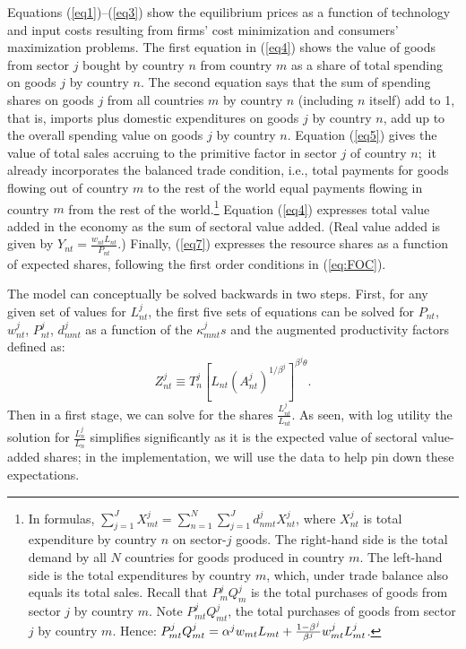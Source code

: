 \documentclass{article}
\begin{document}
Equations (\ref{eq1})--(\ref{eq3}) show the equilibrium prices as a function
of technology and input costs resulting from firms' cost minimization and
consumers' maximization problems. The first equation in (\ref{eq4}) shows
the value of goods from sector $j$ bought by country $n$ from country $m$ as
a share of total spending on goods $j$ by country $n.$ The second equation
says that the sum of spending shares on goods $j$ from all countries $m$ by
country $n$ (including $n$ itself) add to 1, that is, imports plus domestic
expenditures on goods $j$ by country $n$, add up to the overall spending
value on goods $j$ by country $n.$ Equation (\ref{eq5}) gives the value of
total sales accruing to the primitive factor in sector $j$ of country $n;$
it already incorporates the balanced trade condition, i.e., total payments
for goods flowing out of country $m$ to the rest of the world equal payments
flowing in country $m$ from the rest of the world.\footnote{%
In formulas, $\sum\nolimits_{j=1}^{J}X_{mt}^{j}=\sum\nolimits_{n=1}^{N}\sum%
\nolimits_{j=1}^{J}d_{nmt}^{j}X_{nt}^{j}$, where $X_{nt}^{j}$ is total
expenditure by country $n$ on sector-$j$ goods. The right-hand side is the
total demand by all $N$ countries for goods produced in country $m$. The
left-hand side is the total expenditures by country $m$, which, under trade
balance also equals its total sales. Recall that $P_{m}^{j}Q_{m}^{j}$ is the
total purchases of goods from sector $j$ by country $m.$ Note $%
P_{mt}^{j}Q_{mt}^{j}$, the total purchases of goods from sector $j$ by
country $m.$ Hence: $P_{mt}^{j}Q_{mt}^{j}=\alpha ^{j}w_{mt}L_{mt}+\frac{%
1-\beta ^{j}}{\beta ^{j}}w_{mt}^{j}L_{mt}^{j}$.} Equation (\ref{eq4})
expresses total value added in the economy as the sum of sectoral value
added. (Real value added is given by $Y_{nt}=\frac{w_{nt}L_{nt}}{P_{nt}}$.)
Finally, (\ref{eq7}) expresses the resource shares as a function of expected
shares, following the first order conditions in (\ref{eq:FOC}).

The model can conceptually be solved backwards in two steps. First, for any
given set of values for $L_{nt}^{j}$, the first five sets of equations can
be solved for $P_{nt}$, $w_{nt}^{j}$, $P_{nt}^{j}$, $d_{nmt}^{j}$ as a
function of the $\kappa _{mnt}^{j}s$ and the augmented productivity factors
defined as: 
\begin{equation}
Z_{nt}^{j}\equiv T_{n}^{j}\left[ L_{nt}\left( A_{nt}^{j}\right) ^{1/\beta
^{j}}\right] ^{\beta ^{j}\theta }.  \label{productivityfactor}
\end{equation}%
Then in a first stage, we can solve for the shares $\frac{L_{nt}^{j}}{L_{nt}}
$. As seen, with log utility the solution for $\frac{L_{n}^{j}}{L_{n}}$
simplifies significantly as it is the expected value of sectoral value-added
shares; in the implementation, we will use the data to help pin down these
expectations.
\end{document}
